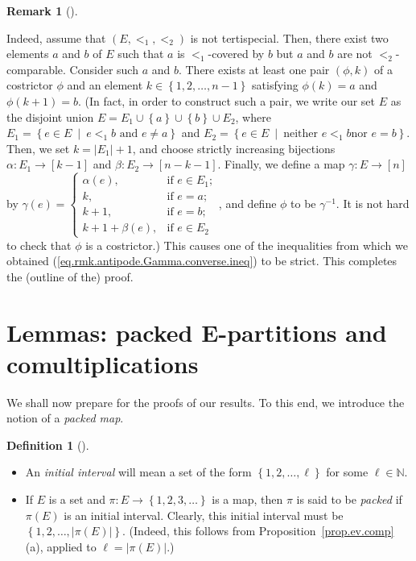 \documentclass[numbers=enddot,12pt,final,onecolumn,notitlepage,abstracton]{scrartcl}
\theoremstyle{definition}
\newtheorem{defi}[theo]{Definition}
\newenvironment{definition}[1][]
{\begin{defi}[#1]\begin{leftbar}}
{\end{leftbar}\end{defi}}
\newtheorem{remk}[theo]{Remark}
\newenvironment{remark}[1][]
{\begin{remk}[#1]\begin{leftbar}}
{\end{leftbar}\end{remk}}
\newenvironment{verlong}{}{}
\newcommand{\EE}{{\mathbf{E}}}
\newcommand{\NN}{{\mathbb{N}}}
\begin{document}
\begin{remark}
\begin{verlong}
Indeed, assume that $\left(  E,<_{1},<_{2}\right)  $ is not tertispecial.
Then, there exist two elements $a$ and $b$ of $E$ such that $a$ is $<_{1}%
$-covered by $b$ but $a$ and $b$ are not $<_{2}$-comparable. Consider such $a$
and $b$. There exists at least one pair $\left(  \phi,k\right)  $ of a
costrictor $\phi$ and an element $k\in\left\{  1,2,\ldots,n-1\right\}  $
satisfying $\phi\left(  k\right)  =a$ and $\phi\left(  k+1\right)  =b$. (In
fact, in order to construct such a pair, we write our set $E$ as the
disjoint union $E=E_{1}\cup\left\{  a\right\}  \cup\left\{  b\right\}  \cup
E_{2}$, where $E_{1}=\left\{  e\in E\ \mid\ e<_{1}b\text{ and }e\neq
a\right\}  $ and $E_{2}=\left\{  e\in E\ \mid\ \text{neither }e<_{1}b\text{
nor }e=b\right\}  $. Then, we set $k=\left\vert E_{1}\right\vert +1$, and
choose strictly increasing bijections $\alpha:E_{1}\rightarrow\left[
k-1\right]  $ and $\beta:E_{2}\rightarrow\left[  n-k-1\right]  $. Finally, we
define a map $\gamma:E\rightarrow\left[  n\right]  $ by $\gamma\left(
e\right)  =
\begin{cases}
\alpha\left(  e\right)  , & \text{if }e\in E_{1};\\
k, & \text{if }e=a;\\
k+1, & \text{if }e=b;\\
k+1+\beta\left(  e\right)  , & \text{if }e\in E_{2}
\end{cases}
$, and define $\phi$ to be $\gamma^{-1}$. It is not hard to check that $\phi$
is a costrictor.) This causes one of the inequalities from which we obtained
(\ref{eq.rmk.antipode.Gamma.converse.ineq}) to be strict. This completes the
(outline of the) proof.
\end{verlong}
\end{remark}

\section{Lemmas: packed $\EE$-partitions and comultiplications}
\label{sect.lemmas}

We shall now prepare for the proofs of our results. To this end,
we introduce the notion of a \textit{packed map}.

\begin{definition}
\begin{itemize}

\item[(a)]
An \textit{initial interval} will mean a set of the form
$\left\{1, 2, \ldots, \ell\right\}$ for some $\ell \in \NN$.

\item[(b)]
If $E$ is a set and $\pi : E \to \left\{1, 2, 3, \ldots\right\}$ is
a map, then $\pi$ is said to be \textit{packed} if $\pi\left(E\right)$
is an initial interval. Clearly, this initial interval must be
$\left\{1, 2, \ldots, \left|\pi\left(E\right)\right|\right\}$.
\begin{verlong}
(Indeed, this follows from
Proposition~\ref{prop.ev.comp} (a), applied to
$\ell = \left|\pi\left(E\right)\right|$.)
\end{verlong}

\end{itemize}
\end{definition}
\end{document}
